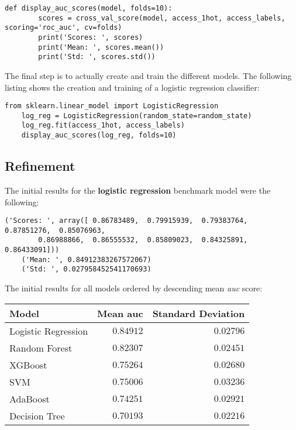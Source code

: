 \documentclass[11pt]{article}
\begin{document}
\begin{lstlisting}[frame=single]
    def display_auc_scores(model, folds=10):
        scores = cross_val_score(model, access_1hot, access_labels, scoring='roc_auc', cv=folds)
        print('Scores: ', scores)
        print('Mean: ', scores.mean())
        print('Std: ', scores.std())
\end{lstlisting}
\noindent
The final step is to actually create and train the different models. 
The following listing shows the creation and training 
of a logistic regression classifier:

\begin{lstlisting}[frame=single]
    from sklearn.linear_model import LogisticRegression
    log_reg = LogisticRegression(random_state=random_state)
    log_reg.fit(access_1hot, access_labels)
    display_auc_scores(log_reg, folds=10)
\end{lstlisting}

\subsection{Refinement}
The initial results for the {\bf logistic regression} benchmark model
were the following:
\begin{lstlisting}[frame=single]
    ('Scores: ', array([ 0.86783489,  0.79915939,  0.79383764,  0.87851276,  0.85076963,
        0.86988866,  0.86555532,  0.85809023,  0.84325891,  0.86433091]))
    ('Mean: ', 0.84912383267572067)
    ('Std: ', 0.027958452541170693)
\end{lstlisting}
\noindent
The initial results for all models ordered by descending mean {\it auc} score:

\begin{center}
    \begin{tabular}{l|r|r}
        {\bf Model} & {\bf Mean auc} & {\bf Standard Deviation} \\ \hline 
        Logistic Regression & $0.84912$ & $0.02796$ \\
        Random Forest & $0.82307$ & $0.02451$ \\
        XGBoost & $0.75264$ & $0.02680$ \\
        SVM & $0.75006$ & $0.03236$ \\
        AdaBoost & $0.74251$ & $0.02921$ \\
        Decision Tree & $0.70193$ & $0.02216$ \\
    \end{tabular}
\end{center}
\end{document}
